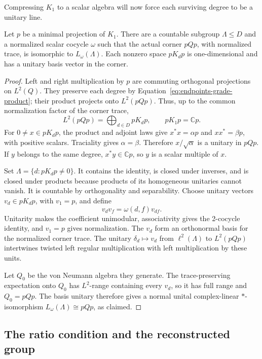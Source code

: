 Compressing $K_1$ to a scalar algebra will now force each surviving
degree to be a unitary line.

\begin{lemma}
\label{lem:endpoints-minimal-corner}
Let \(p\) be a minimal projection of \(K_1\).  There are a countable
subgroup \(\Lambda\leq D\) and a normalized scalar cocycle \(\omega\)
such that the actual corner \(pQp\), with normalized trace, is
isomorphic to \(L_\omega(\Lambda)\).  Each nonzero space \(pK_dp\)
is one-dimensional and has a unitary basis vector in the corner.
\end{lemma}

\begin{proof}
Left and right multiplication by \(p\) are commuting orthogonal
projections on \(L^2(Q)\).  They preserve each degree by
Equation~\eqref{eq:endpoints-grade-product}; their product projects
onto \(L^2(pQp)\).  Thus, up to the common normalization factor of
the corner trace,
\[
 L^2(pQp)=\bigoplus_{d\in D}pK_dp,\qquad pK_1p=\mathbb Cp.
\]
For \(0\ne x\in pK_dp\), the product and adjoint laws give
\(x^*x=\alpha p\) and \(xx^*=\beta p\), with positive scalars.
Traciality gives \(\alpha=\beta\).  Therefore
\(x/\sqrt\alpha\) is a unitary in \(pQp\).
If \(y\) belongs to the same degree, \(x^*y\in\mathbb Cp\), so
\(y\) is a scalar multiple of \(x\).

Set \(\Lambda=\{d:pK_dp\ne0\}\).  It contains the identity, is
closed under inverses, and is closed under products because products
of its homogeneous unitaries cannot vanish.  It is countable by
orthogonality and separability.  Choose unitary vectors
\(v_d\in pK_dp\), with \(v_1=p\), and define
\[
 v_dv_f=\omega(d,f)v_{df}.
\]
Unitarity makes the coefficient unimodular, associativity gives the
2-cocycle identity, and \(v_1=p\) gives normalization.
The \(v_d\) form an orthonormal basis for the normalized corner
trace.  The unitary \(\delta_d\mapsto v_d\) from \(\ell^2(\Lambda)\)
to \(L^2(pQp)\) intertwines twisted left regular multiplication with
left multiplication by these units.

Let \(Q_0\) be the von Neumann algebra they generate.  The
trace-preserving expectation onto \(Q_0\) has \(L^2\)-range containing
every \(v_d\), so it has full range and \(Q_0=pQp\).
The basis unitary therefore gives a normal unital complex-linear
\(*\)-isomorphism \(L_\omega(\Lambda)\cong pQp\), as claimed.
\end{proof}

\subsection{The ratio condition and the reconstructed group}

